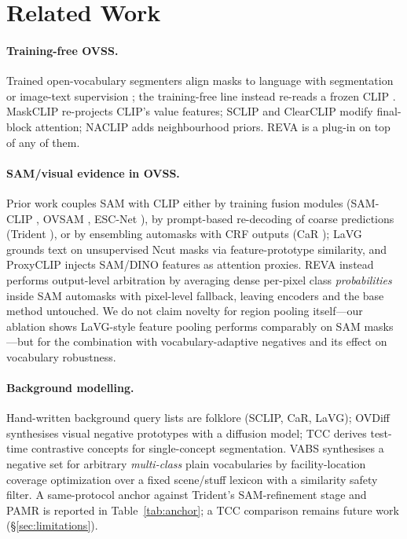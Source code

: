 \documentclass[11pt]{article}
\newcommand{\reva}{REVA}
\begin{document}
\section{Related Work}

\paragraph{Training-free OVSS.} Trained open-vocabulary segmenters align masks to
language with segmentation or image-text supervision
\citep{li2022lseg,xu2022groupvit,liang2023ovseg,xu2023san,cho2024catseg}; the
training-free line instead re-reads a frozen CLIP \citep{radford2021clip}.
MaskCLIP \citep{zhou2022maskclip} re-projects CLIP's
value features; SCLIP \citep{wang2024sclip} and ClearCLIP \citep{lan2024clearclip}
modify final-block attention; NACLIP \citep{hajimiri2024naclip} adds neighbourhood
priors. \reva{} is a plug-in on top of any of them.

\paragraph{SAM/visual evidence in OVSS.} Prior work couples SAM with CLIP either by
training fusion modules (SAM-CLIP \citep{wang2024samclip}, OVSAM \citep{yuan2024ovsam},
ESC-Net \citep{lee2025escnet}), by prompt-based re-decoding of coarse predictions
(Trident \citep{shi2025trident}), or by ensembling automasks with CRF outputs (CaR
\citep{sun2024car}); LaVG \citep{kang2024lavg} grounds text on unsupervised Ncut masks
via feature-prototype similarity, and ProxyCLIP \citep{lan2024proxyclip} injects
SAM/DINO features as attention proxies. \reva{} instead performs output-level
arbitration by averaging dense per-pixel class \emph{probabilities} inside SAM
automasks with pixel-level fallback, leaving encoders and the base method untouched.
We do not claim novelty for region pooling itself---our ablation shows LaVG-style
feature pooling performs comparably on SAM masks---but for the combination with
vocabulary-adaptive negatives and its effect on vocabulary robustness.

\paragraph{Background modelling.} Hand-written background query lists are folklore
(SCLIP, CaR, LaVG); OVDiff \citep{karazija2024ovdiff} synthesises visual negative
prototypes with a diffusion model; TCC \citep{tcc2024} derives test-time contrastive
concepts for single-concept segmentation. VABS synthesises a negative set for
arbitrary \emph{multi-class} plain vocabularies by facility-location coverage
optimization over a fixed scene/stuff lexicon with a similarity safety filter. A same-protocol
anchor against Trident's SAM-refinement stage and PAMR is reported in
Table~\ref{tab:anchor}; a TCC comparison remains future work
(\S\ref{sec:limitations}).
\end{document}
